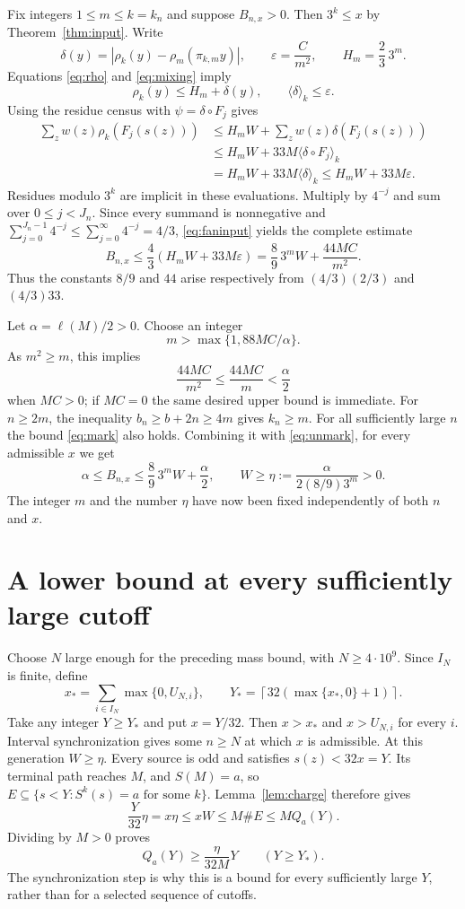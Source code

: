 Fix integers $1\le m\le k=k_n$ and suppose $B_{n,x}>0$.
Then $3^k\le x$ by Theorem~\ref{thm:input}. Write
\[
 \delta(y)=|\rho_k(y)-\rho_m(\pi_{k,m}y)|,\qquad
 \varepsilon=\frac{C}{m^2},\qquad H_m=\frac23\,3^m.
\]
Equations \eqref{eq:rho} and \eqref{eq:mixing} imply
\[
 \rho_k(y)\le H_m+\delta(y),\qquad
 \langle\delta\rangle_k\le\varepsilon.
\]
Using the residue census with $\psi=\delta\circ F_j$ gives
\[
 \begin{split}
 \sum_z w(z)\rho_k(F_j(s(z)))
 &\le H_m W+\sum_z w(z)\delta(F_j(s(z)))\\
 &\le H_mW+33M\langle\delta\circ F_j\rangle_k\\
 &=H_mW+33M\langle\delta\rangle_k
 \le H_mW+33M\varepsilon.
 \end{split}
\]
Residues modulo $3^k$ are implicit in these evaluations. Multiply by
$4^{-j}$ and sum over $0\le j<J_n$. Since every summand is nonnegative and
$\sum_{j=0}^{J_n-1}4^{-j}\le\sum_{j=0}^\infty4^{-j}=4/3$,
\eqref{eq:faninput} yields the complete estimate
\begin{equation}\label{eq:unmark}
 B_{n,x}\le\frac43(H_mW+33M\varepsilon)
 =\frac89\,3^m W+\frac{44MC}{m^2}.
\end{equation}
Thus the constants $8/9$ and $44$ arise respectively from
$(4/3)(2/3)$ and $(4/3)33$.

Let $\alpha=\ell(M)/2>0$. Choose an integer
\begin{equation}\label{eq:mchoice}
 m>\max\{1,88MC/\alpha\}.
\end{equation}
As $m^2\ge m$, this implies
\[
 \frac{44MC}{m^2}\le\frac{44MC}{m}<\frac\alpha2
\]
when $MC>0$; if $MC=0$ the same desired upper bound is immediate.
For $n\ge2m$, the inequality $b_n\ge b+2n\ge4m$ gives $k_n\ge m$.
For all sufficiently large $n$ the bound \eqref{eq:mark} also holds.
Combining it with \eqref{eq:unmark}, for every admissible $x$ we get
\[
 \alpha\le B_{n,x}\le\frac89\,3^mW+\frac\alpha2,
 \qquad W\ge\eta:=\frac{\alpha}{2(8/9)3^m}>0.
\]
The integer $m$ and the number $\eta$ have now been fixed independently
of both $n$ and $x$.

\section{A lower bound at every sufficiently large cutoff}
Choose $N$ large enough for the preceding mass bound, with
$N\ge4\cdot10^9$. Since $I_N$ is finite, define
\[
 x_* =\sum_{i\in I_N}\max\{0,U_{N,i}\},\qquad
 Y_* =\left\lceil32(\max\{x_*,0\}+1)\right\rceil.
\]
Take any integer $Y\ge Y_*$ and put $x=Y/32$. Then $x>x_*$ and
$x>U_{N,i}$ for every $i$. Interval synchronization gives some $n\ge N$
at which $x$ is admissible. At this generation $W\ge\eta$.
Every source is odd and satisfies $s(z)<32x=Y$. Its terminal path
reaches $M$, and $S(M)=a$, so $E\subseteq\{s<Y:S^k(s)=a\text{ for some }k\}$.
Lemma~\ref{lem:charge} therefore gives
\[
 \frac{Y}{32}\eta=x\eta\le xW\le M\#E\le M Q_a(Y).
\]
Dividing by $M>0$ proves
\begin{equation}\label{eq:odddensity}
 Q_a(Y)\ge\frac{\eta}{32M}Y\qquad(Y\ge Y_*).
\end{equation}
The synchronization step is why this is a bound for every sufficiently
large $Y$, rather than for a selected sequence of cutoffs.

